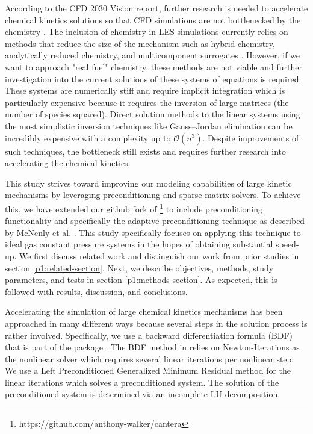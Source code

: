 According to the CFD 2030 Vision report, further research is needed to accelerate chemical kinetics solutions so that CFD simulations are not bottlenecked by the chemistry \cite{slotnick_cfd_2014}.
The inclusion of chemistry in LES simulations currently relies on methods that reduce the size of the mechanism such as hybrid chemistry, analytically reduced chemistry, and multicomponent surrogates \cite{felden_including_2016}.
However, if we want to approach "real fuel" chemistry, these methods are not viable and further investigation into the current solutions of these systems of equations is required.
These systems are numerically stiff and require implicit integration which is particularly expensive because it requires the inversion of large matrices (the number of species squared).
Direct solution methods to the linear systems using the most simplistic inversion techniques like Gauss–Jordan elimination can be incredibly expensive with a complexity up to $\mathcal{O}(n^3)$.
Despite improvements of such techniques, the bottleneck still exists and requires further research into accelerating the chemical kinetics.

This study strives toward improving our modeling capabilities of large kinetic mechanisms by leveraging preconditioning and sparse matrix solvers.
To achieve this, we have extended our github fork of \cantera{}\footnote{https://github.com/anthony-walker/cantera} to include preconditioning functionality and specifically the adaptive preconditioning technique as described by McNenly et al. \cite{mcnenly_faster_2015}.
This study specifically focuses on applying this technique to ideal gas constant pressure systems in the hopes of obtaining substantial speed-up.
We first discuss related work and distinguish our work from prior studies in section \ref{p1:related-section}. Next, we describe objectives, methods, study
parameters, and tests in section \ref{p1:methods-section}. As expected, this is followed
with results, discussion, and conclusions.

\label{p1:related-section}

Accelerating the simulation of large chemical kinetics mechanisms has been approached in many different ways because several steps in the solution process is rather involved.
Specifically, we use a backward differentiation formula (BDF) that is part of the \sundials{} \cvodes{} package \cite{cohen_cvode_1996, hindmarsh_sundials_2005}.
The BDF method in \cvodes{} relies on Newton-Iterations as the nonlinear solver which requires several linear iterations per nonlinear step.
We use a Left Preconditioned Generalized Minimum Residual method for the linear iterations which solves a preconditioned system.
The solution of the preconditioned system is determined via an incomplete LU decomposition.

